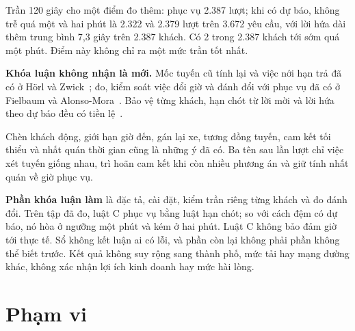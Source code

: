 Trần 120 giây cho một điểm đo thêm: phục vụ 2.387 lượt; khi có dự báo, không trễ quá một và hai phút là
2.322 và 2.379 lượt trên 3.672 yêu cầu, với lời hứa dài thêm trung bình 7,3 giây trên 2.387 khách.
Có 2 trong 2.387 khách tới sớm quá một phút. Điểm này không chỉ ra một mức trần tốt nhất.

\begin{khungy}
\textbf{Khóa luận không nhận là mới.} Mốc tuyến cũ tính lại và việc nới hạn trả đã có ở Hörl và
Zwick~\cite{horl2022}; đo, kiểm soát việc đổi giờ và đánh đổi với phục vụ đã có ở Fielbaum và
Alonso-Mora~\cite{fielbaum2020}. Bảo vệ từng khách, hạn chót từ lời mời và lời hứa theo dự báo đều có
tiền lệ~\cite{elmi2026,schulz2026,hu2022}.

Chèn khách động, giới hạn giờ đến, gán lại xe, tương đồng tuyến, cam kết tối thiểu và nhất quán thời gian
cũng là những ý đã có. Ba tên sau lần lượt chỉ việc xét tuyến giống nhau, trì hoãn cam kết
khi còn nhiều phương án và giữ tính nhất quán về giờ phục vụ.

\textbf{Phần khóa luận làm} là đặc tả, cài đặt, kiểm trần riêng từng khách và đo đánh đổi. Trên tập đã đo,
luật C phục vụ bằng luật hạn chót; so với cách đệm có dự báo, nó hòa ở ngưỡng một phút và kém ở hai phút.
Luật C không bảo đảm giờ tới thực tế. Sổ không kết luận ai có lỗi, và phần còn lại không phải phần
không thể biết trước. Kết quả không suy rộng sang thành phố, mức tải hay mạng đường khác, không xác nhận
lợi ích kinh doanh hay mức hài lòng.
\end{khungy}

\section{Phạm vi}
\label{muc:c1-phamvi}

